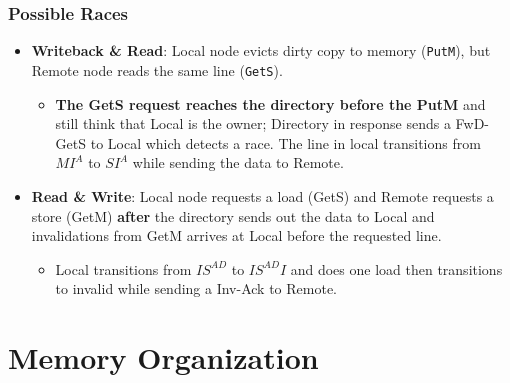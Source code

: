 \documentclass{article}
\begin{document}
\begin{multicols*}{2}
\subsubsection{Possible Races}
\begin{itemize}
    \item \textbf{Writeback \& Read}: Local node evicts dirty copy to memory (\texttt{PutM}), but Remote node reads the same line (\texttt{GetS}). 
    \begin{itemize}
        \item \textbf{The GetS request reaches the directory before the PutM} and still think that Local is the owner; Directory in response sends a FwD-GetS to Local which detects a race. The line in local transitions from $MI^A$ to $SI^A$ while sending the data to Remote.
    \end{itemize}
    \item \textbf{Read \& Write}: Local node requests a load (GetS) and Remote requests a store (GetM) \textbf{after} the directory sends out the data to Local and invalidations from GetM arrives at Local before the requested line.
    \begin{itemize}
        \item Local transitions from $IS^{AD}$ to $IS^{AD}I$ and does one load then transitions to invalid while sending a Inv-Ack to Remote.
    \end{itemize}
\end{itemize}



\section{Memory Organization}

\end{multicols*}
\end{document}
